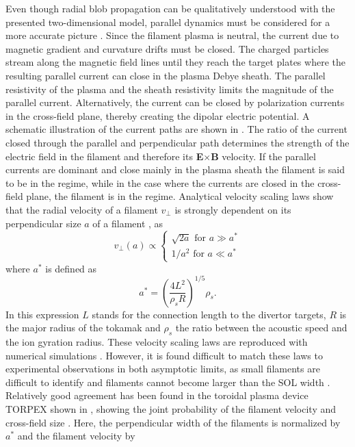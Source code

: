Even though radial blob propagation can be qualitatively understood with the presented
two-dimensional model, parallel dynamics must be considered for a more accurate picture
\cite{krasheninnikov2008recent}. Since the filament plasma is neutral, the current due
to magnetic gradient and curvature drifts must be closed. The charged particles stream
along the magnetic field lines until they reach the target plates where the resulting
parallel current can close in the plasma Debye sheath. The parallel resistivity of the
plasma and the sheath resistivity limits the magnitude of the parallel current.
Alternatively, the current can be closed by polarization currents in the cross-field
plane, thereby creating the dipolar electric potential. A schematic illustration of the
current paths are shown in . The ratio of the current closed
through the parallel and perpendicular path determines the strength of the electric
field in the filament and therefore its \textbf{E}$\times$\textbf{B} velocity. If the
parallel currents are dominant and close mainly in the plasma sheath the filament is
said to be in the  regime, while in the case where the currents are
closed in the cross-field plane, the filament is in the  regime.
Analytical velocity scaling laws show that the radial velocity of a filament $v_\perp$
is strongly dependent on its perpendicular size $a$ of a filament
\cite{theiler2009cross, angus2012effects}, as
\begin{equation}
  v_\perp(a)  \propto	\begin{cases}
    \sqrt{2 a} \,\, \textrm{for}\,\, a \gg a^* \\
    1/a^2 \,\, \textrm{for}\,\, a \ll a^*
  \end{cases}
\end{equation}
where $a^*$ is defined as
\begin{equation}
  a^* = \left(\frac{4 L^2}{\rho_s R}\right)^{1/5}\rho_s.
\end{equation}
In this expression $L$ stands for the connection length to the divertor targets, $R$ is the major radius of the tokamak and $\rho_s$ the ratio between the acoustic speed and the ion gyration radius. These velocity scaling laws are reproduced with numerical simulations \cite{garcia2006radial,kube2012effect,kube2016amplitude}. However, it is found difficult to match these laws to experimental observations in both asymptotic limits, as small filaments are difficult to identify and filaments cannot become larger than the SOL width \cite{myra2006blob,kube2013blob}. Relatively good agreement has been found in the toroidal plasma device TORPEX shown in , showing the joint probability of the filament velocity and cross-field size \cite{theiler2009cross}. Here, the perpendicular width of the filaments is normalized by $a^*$ and the filament velocity by
